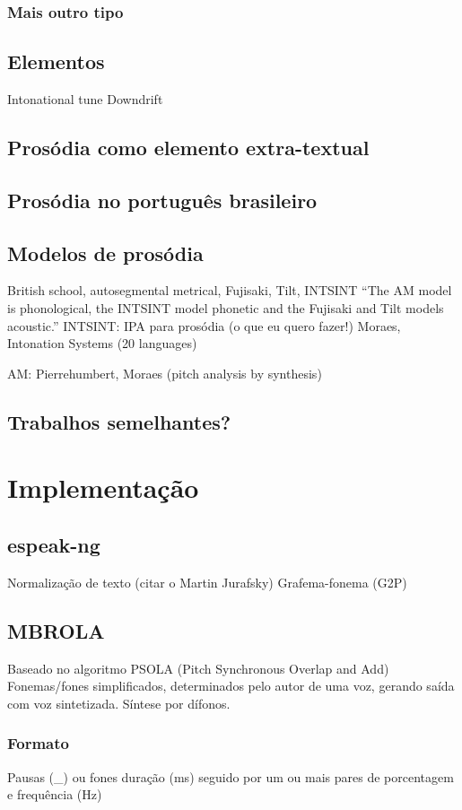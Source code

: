 \subsubsection{Mais outro tipo}
\subsection{Elementos}
Intonational tune
Downdrift
\subsection{Prosódia como elemento extra-textual}
\subsection{Prosódia no português brasileiro}
\subsection{Modelos de prosódia}
British school, autosegmental metrical, Fujisaki, Tilt, INTSINT
``The AM model is phonological, the INTSINT model phonetic and the Fujisaki and Tilt models acoustic.''
INTSINT: IPA para prosódia (o que eu quero fazer!)
Moraes, Intonation Systems (20 languages)

AM: Pierrehumbert, Moraes (pitch analysis by synthesis)
\subsection{Trabalhos semelhantes?}

\section{Implementação}
\subsection{espeak-ng}
Normalização de texto (citar o Martin Jurafsky)
Grafema-fonema (G2P)
\subsection{MBROLA}
Baseado no algoritmo PSOLA (Pitch Synchronous Overlap and Add)
Fonemas/fones simplificados, determinados pelo autor de uma voz, gerando saída
com voz sintetizada. Síntese por dífonos.
\subsubsection{Formato}
Pausas (_) ou fones
duração (ms) seguido por um ou mais pares de porcentagem e frequência (Hz)
